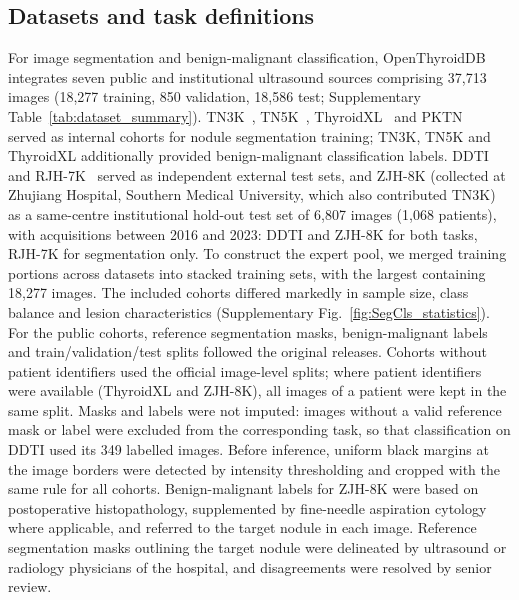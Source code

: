 \documentclass[fleqn,10pt]{wlscirep}
\begin{document}
\subsection{Datasets and task definitions}
For image segmentation and benign-malignant classification, OpenThyroidDB integrates seven public and institutional ultrasound sources comprising 37{,}713 images (18{,}277 training, 850 validation, 18{,}586 test; Supplementary Table~\ref{tab:dataset_summary}). TN3K~\cite{gong2021multi}, TN5K~\cite{zhang2025tn5000}, ThyroidXL~\cite{duong2025thyroidxl} and PKTN~\cite{sun2025clip} served as internal cohorts for nodule segmentation training; TN3K, TN5K and ThyroidXL additionally provided benign-malignant classification labels. DDTI~\cite{pedraza2015open} and RJH-7K~\cite{shusharina2021segmentation} served as independent external test sets, and ZJH-8K (collected at Zhujiang Hospital, Southern Medical University, which also contributed TN3K) as a same-centre institutional hold-out test set of 6{,}807 images (1{,}068 patients), with acquisitions between 2016 and 2023: DDTI and ZJH-8K for both tasks, RJH-7K for segmentation only. To construct the expert pool, we merged training portions across datasets into stacked training sets, with the largest containing 18,277 images. The included cohorts differed markedly in sample size, class balance and lesion characteristics (Supplementary Fig.~\ref{fig:SegCls_statistics}). For the public cohorts, reference segmentation masks, benign-malignant labels and train/validation/test splits followed the original releases. Cohorts without patient identifiers used the official image-level splits; where patient identifiers were available (ThyroidXL and ZJH-8K), all images of a patient were kept in the same split. Masks and labels were not imputed: images without a valid reference mask or label were excluded from the corresponding task, so that classification on DDTI used its 349 labelled images. Before inference, uniform black margins at the image borders were detected by intensity thresholding and cropped with the same rule for all cohorts. Benign-malignant labels for ZJH-8K were based on postoperative histopathology, supplemented by fine-needle aspiration cytology where applicable, and referred to the target nodule in each image. Reference segmentation masks outlining the target nodule were delineated by ultrasound or radiology physicians of the hospital, and disagreements were resolved by senior review.
\end{document}
